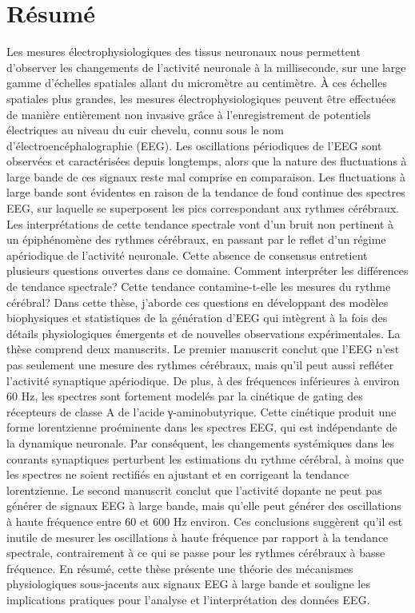 \documentclass[11pt]{report}
\begin{document}
\chapter*{Résumé}
Les mesures électrophysiologiques des tissus neuronaux nous permettent d'observer les changements de l'activité neuronale à la milliseconde, sur une large gamme d'échelles spatiales allant du micromètre au centimètre. À ces échelles spatiales plus grandes, les mesures électrophysiologiques peuvent être effectuées de manière entièrement non invasive grâce à l'enregistrement de potentiels électriques au niveau du cuir chevelu, connu sous le nom d'électroencéphalographie (EEG). Les oscillations périodiques de l'EEG sont observées et caractérisées depuis longtemps, alors que la nature des fluctuations à large bande de ces signaux reste mal comprise en comparaison. Les fluctuations à large bande sont évidentes en raison de la tendance de fond continue des spectres EEG, sur laquelle se superposent les pics correspondant aux rythmes cérébraux. Les interprétations de cette tendance spectrale vont d'un bruit non pertinent à un épiphénomène des rythmes cérébraux, en passant par le reflet d'un régime apériodique de l'activité neuronale. Cette absence de consensus entretient plusieurs questions ouvertes dans ce domaine. Comment interpréter les différences de tendance spectrale? Cette tendance contamine-t-elle les mesures du rythme cérébral? Dans cette thèse, j'aborde ces questions en développant des modèles biophysiques et statistiques de la génération d'EEG qui intègrent à la fois des détails physiologiques émergents et de nouvelles observations expérimentales. La thèse comprend deux manuscrits. Le premier manuscrit conclut que l'EEG n'est pas seulement une mesure des rythmes cérébraux, mais qu'il peut aussi refléter l'activité synaptique apériodique. De plus, à des fréquences inférieures à environ 60 Hz, les spectres sont fortement modelés par la cinétique de gating des récepteurs de classe A de l'acide γ-aminobutyrique. Cette cinétique produit une forme lorentzienne proéminente dans les spectres EEG, qui est indépendante de la dynamique neuronale. Par conséquent, les changements systémiques dans les courants synaptiques perturbent les estimations du rythme cérébral, à moins que les spectres ne soient rectifiés en ajustant et en corrigeant la tendance lorentzienne. Le second manuscrit conclut que l'activité dopante ne peut pas générer de signaux EEG à large bande, mais qu'elle peut générer des oscillations à haute fréquence entre 60 et 600 Hz environ. Ces conclusions suggèrent qu'il est inutile de mesurer les oscillations à haute fréquence par rapport à la tendance spectrale, contrairement à ce qui se passe pour les rythmes cérébraux à basse fréquence. En résumé, cette thèse présente une théorie des mécanismes physiologiques sous-jacents aux signaux EEG à large bande et souligne les implications pratiques pour l'analyse et l'interprétation des données EEG.
\end{document}
